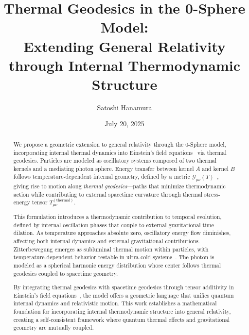 \documentclass[%
 reprint,
 amsmath,amssymb,
 aps,
]{revtex4-1}
\numberwithin{equation}{section}%
\begin{document}


\title{Thermal Geodesics in the 0-Sphere Model:\\ Extending General Relativity through Internal Thermodynamic Structure}
\author{Satoshi Hanamura}
\date{July 20, 2025}


\begin{abstract}
We propose a geometric extension to general relativity through the 0-Sphere model, incorporating internal thermal dynamics into Einstein's field equations~\cite{landau1975,wald1984} via thermal geodesics. Particles are modeled as oscillatory systems composed of two thermal kernels and a mediating photon sphere. Energy transfer between kernel $A$ and kernel $B$ follows temperature-dependent internal geometry, defined by a metric $\mathcal{G}_{\mu\nu}(T)$~\cite{connes1994}, giving rise to motion along \textit{thermal geodesics}—paths that minimize thermodynamic action while contributing to external spacetime curvature through thermal stress-energy tensor $T_{\mu\nu}^{(\text{thermal})}$.

This formulation introduces a thermodynamic contribution to temporal evolution, defined by internal oscillation phases that couple to external gravitational time dilation. As temperature approaches absolute zero, oscillatory energy flow diminishes, affecting both internal dynamics and external gravitational contributions. Zitterbewegung emerges as subluminal thermal motion within particles, with temperature-dependent behavior testable in ultra-cold systems~\cite{gerritsma2010,fan2023}. The photon is modeled as a spherical harmonic energy distribution whose center follows thermal geodesics coupled to spacetime geometry.

By integrating thermal geodesics with spacetime geodesics through tensor additivity in Einstein's field equations~\cite{wald1984}, the model offers a geometric language that unifies quantum internal dynamics and relativistic motion. This work establishes a mathematical foundation for incorporating internal thermodynamic structure into general relativity, creating a self-consistent framework where quantum thermal effects and gravitational geometry are mutually coupled.
\end{abstract}
\end{document}
